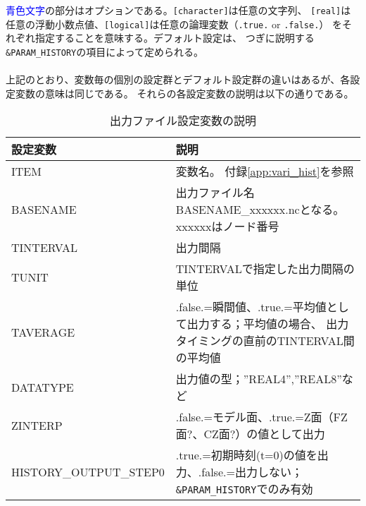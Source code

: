 \textcolor{blue}{青色文字}の部分はオプションである。\verb|[character]|は任意の文字列、
\verb|[real]|は任意の浮動小数点値、\verb|[logical]|は任意の論理変数（\verb|.true.| or \verb|.false.|）
をそれぞれ指定することを意味する。デフォルト設定は、
つぎに説明する\verb|&PARAM_HISTORY|の項目によって定められる。\\

\\

上記のとおり、変数毎の個別の設定群とデフォルト設定群の違いはあるが、各設定変数の意味は同じである。
それらの各設定変数の説明は以下の通りである。\\

\begin{table}[htb]
\begin{center}
\caption{出力ファイル設定変数の説明}
\begin{tabularx}{150mm}{|l|X|} \hline
 \rowcolor[gray]{0.9} 設定変数 & 説明 \\ \hline
 ITEM                   & 変数名。 付録\ref{app:vari_hist}を参照\\ \hline
 BASENAME               & 出力ファイル名 BASENAME\_xxxxxx.ncとなる。xxxxxxはノード番号\\ \hline
 TINTERVAL              & 出力間隔\\ \hline
 TUNIT                  & TINTERVALで指定した出力間隔の単位\\ \hline
 TAVERAGE               & .false.=瞬間値、.true.=平均値として出力する；平均値の場合、
 出力タイミングの直前のTINTERVAL間の平均値\\ \hline
 DATATYPE               & 出力値の型；''REAL4'',''REAL8''など\\ \hline
 ZINTERP                & .false.=モデル面、.true.=Z面（FZ面$?$、CZ面$?$）の値として出力\\ \hline
 HISTORY\_OUTPUT\_STEP0 & .true.=初期時刻(t=0)の値を出力、.false.=出力しない；\verb|&PARAM_HISTORY|でのみ有効\\ \hline
\end{tabularx}
\label{tab:history_settings}
\end{center}
\end{table}

